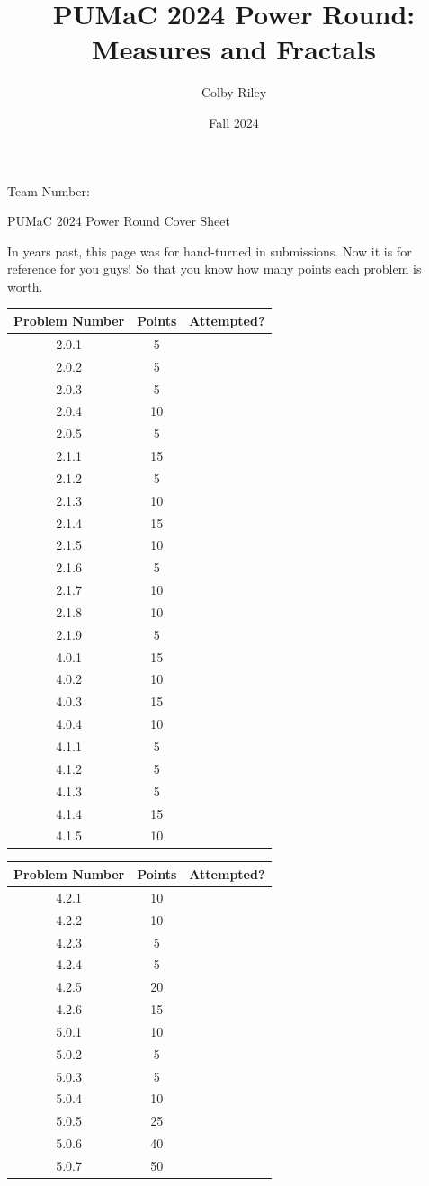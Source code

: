 \documentclass[11pt]{article}
\title{PUMaC 2024 Power Round: \\ Measures and Fractals}
\author{Colby Riley}
\date{Fall 2024}
\theoremstyle{definition}
\theoremstyle{remark}
\theoremstyle{problem}
\begin{document}
\thispagestyle{empty}
\noindent \huge{Team Number:} \underline{\phantom{}}

\vspace{.5cm}
\noindent \huge{PUMaC 2024 Power Round Cover Sheet}

\vspace{.5cm}
\normalsize
In years past, this page was for hand-turned in submissions. Now it is for reference for you guys! So that you know how many points each problem is worth. 

\begin{center}
\begin{tabular}{|c|c|c|}\hline
Problem Number & Points & Attempted?\\\hline
2.0.1 & 5 &  \\\hline
2.0.2 & 5 &  \\\hline
2.0.3 & 5 &  \\\hline
2.0.4 & 10 &  \\\hline
2.0.5 & 5 &  \\\hline
2.1.1 & 15 &  \\\hline
2.1.2 & 5 &  \\\hline
2.1.3 & 10 &  \\\hline
2.1.4 & 15 & \\\hline
2.1.5 & 10 & \\\hline
2.1.6 & 5 & \\\hline
2.1.7 & 10 & \\\hline
2.1.8 & 10 & \\\hline
2.1.9 & 5 & \\\hline
4.0.1 & 15 & \\\hline
4.0.2 & 10 & \\\hline
4.0.3 & 15 & \\\hline
4.0.4 & 10 & \\\hline
4.1.1 & 5 & \\\hline
4.1.2 & 5 & \\\hline
4.1.3 & 5 & \\\hline
4.1.4 & 15 & \\\hline
4.1.5 & 10 & \\\hline
\end{tabular}
\hspace{0.5 cm}
\begin{tabular}{|c|c|c|}\hline
Problem Number & Points & Attempted?\\\hline
4.2.1 & 10 & \\\hline
4.2.2 & 10 & \\\hline
4.2.3 & 5 & \\\hline
4.2.4 & 5 & \\\hline
4.2.5 & 20 & \\\hline
4.2.6 & 15 & \\\hline
5.0.1 & 10 & \\\hline
5.0.2 & 5 & \\\hline
5.0.3 & 5 & \\\hline
5.0.4 & 10 & \\\hline
5.0.5 & 25 & \\\hline
5.0.6 & 40 & \\\hline
5.0.7 & 50 & \\\hline
\end{tabular}
\end{center}
\end{document}
